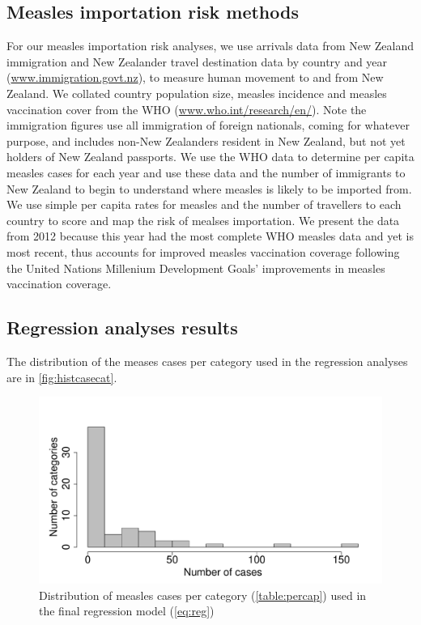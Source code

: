 \documentclass{article}
\begin{document}
\subsection{Measles importation risk methods}
\label{sub:imp_risk}
For our measles importation risk analyses, we use arrivals data from New Zealand immigration and New Zealander travel destination data by country and year (\href{http://www.immigration.govt.nz/}{www.immigration.govt.nz}), to measure human movement to and from New Zealand. We collated country population size, measles incidence and measles vaccination cover from the WHO (\href{http://www.who.int/research/en/}{www.who.int/research/en/}). Note the immigration figures use all immigration of foreign nationals, coming for whatever purpose, and includes non-New Zealanders resident in New Zealand, but not yet holders of New Zealand passports. We use the WHO data to determine per capita measles cases for each year and use these data and the number of immigrants to New Zealand to begin to understand where measles is likely to be imported from. We use simple per capita rates for measles and the number of travellers to each country to score and map the risk of mealses importation. We present the data from 2012 because this year had the most complete WHO measles data and yet is most recent, thus accounts for improved measles vaccination coverage following the United Nations Millenium Development Goals' improvements in measles vaccination coverage. 


\subsection{Regression analyses results}
\label{sub:regression_results}

The distribution of the meases cases per category used in the regression analyses are in \autoref{fig:histcasecat}.
\begin{figure}
\begin{center}
\includegraphics{draftfinalreport_v2-023}
\end{center}
\caption{Distribution of measles cases per category (\autoref{table:percap}) used in the final regression model (\autoref{eq:reg})}
\label{fig:histcasecat}
\end{figure}
\end{document}
